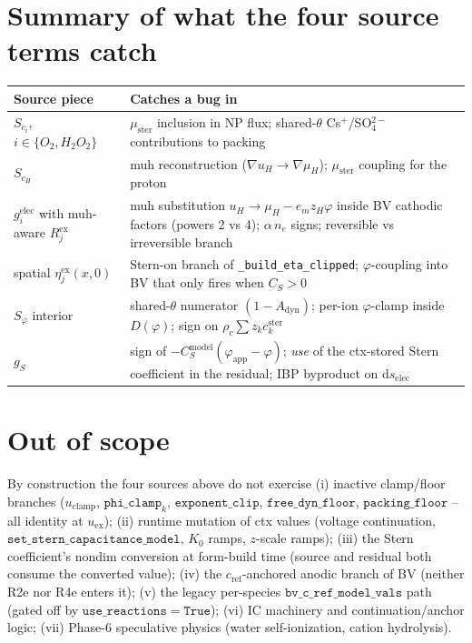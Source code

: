 \documentclass[11pt]{article}
\newcommand{\elec}{\mathrm{elec}}
\newcommand{\ster}{\mathrm{ster}}
\newcommand{\dyn}{\mathrm{dyn}}
\newcommand{\app}{\mathrm{app}}
\newcommand{\modl}{\mathrm{model}}
\begin{document}
\section{Summary of what the four source terms catch}

\begin{center}
\begin{tabular}{ll}
\toprule
Source piece & Catches a bug in \\
\midrule
$S_{c_i}$, $i \in \{O_2, H_2O_2\}$
  & $\mu_\ster$ inclusion in NP flux; shared-$\theta$ Cs$^+$/SO$_4^{2-}$
    contributions to packing \\
$S_{c_H}$
  & muh reconstruction ($\nabla u_H \to \nabla\mu_H$); $\mu_\ster$
    coupling for the proton \\
$g_i^\elec$ with muh-aware $R_j^\mathrm{ex}$
  & muh substitution $u_H \to \mu_H - e_m z_H \varphi$ inside BV
    cathodic factors (powers 2 vs 4); $\alpha\, n_e$ signs; reversible
    vs irreversible branch \\
spatial $\eta_j^\mathrm{ex}(x,0)$
  & Stern-on branch of \verb|_build_eta_clipped|; $\varphi$-coupling
    into BV that only fires when $C_S > 0$ \\
$S_\varphi$ interior
  & shared-$\theta$ numerator $(1 - A_\dyn)$; per-ion $\varphi$-clamp
    inside $D(\varphi)$; sign on $\rho_c \sum z_k c_k^\ster$ \\
$g_S$
  & sign of $-C_S^\modl(\varphi_\app - \varphi)$; \emph{use} of the
    ctx-stored Stern coefficient in the residual; IBP byproduct on
    $\mathrm{d}s_\elec$ \\
\bottomrule
\end{tabular}
\end{center}

\section{Out of scope}

By construction the four sources above do not exercise
(i) inactive clamp/floor branches ($u_\mathrm{clamp}$,
$\mathtt{phi\_clamp}_k$, $\mathtt{exponent\_clip}$, $\mathtt{free\_dyn\_floor}$,
$\mathtt{packing\_floor}$ -- all identity at $u_\mathrm{ex}$);
(ii) runtime mutation of ctx values (voltage continuation,
$\mathtt{set\_stern\_capacitance\_model}$, $K_0$ ramps, $z$-scale ramps);
(iii) the Stern coefficient's nondim conversion at form-build time
(source and residual both consume the converted value);
(iv) the $c_\mathrm{ref}$-anchored anodic branch of BV (neither R2e
nor R4e enters it);
(v) the legacy per-species $\mathtt{bv\_c\_ref\_model\_vals}$ path
(gated off by $\mathtt{use\_reactions} = \mathtt{True}$);
(vi) IC machinery and continuation/anchor logic; (vii) Phase-6
speculative physics (water self-ionization, cation hydrolysis).
\end{document}
